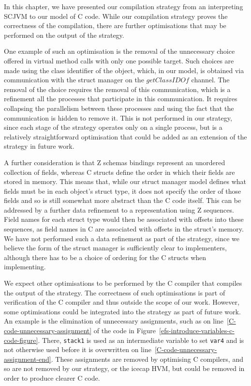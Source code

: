 In this chapter, we have presented our compilation strategy from an
interpreting SCJVM to our model of C code. While our compilation
strategy proves the correctness of the compilation, there are further
optimisations that may be performed on the output of the strategy.

One example of such an optimisation is the removal of the unnecessary
choice offered in virtual method calls with only one possible target.
Such choices are made using the class identifier of the object, which,
in our model, is obtained via communication with the struct manager on
the $getClassIDOf$ channel. 
The removal of the choice requires the removal of this communication,
which is a refinement all the processes that participate in this
communication. 
It requires collapsing the parallelism between these processes and
using the fact that the communication is hidden to remove it. 
This is not performed in our strategy, since each stage of the
strategy operates only on a single process, but is a relatively
straightforward optimisation that could be added as an extension of
the strategy in future work.

A further consideration is that Z schemas bindings represent an
unordered collection of fields, whereas C structs define the order in
which their fields are stored in memory.
This means that, while our struct manager model defines what fields
must be in each object's struct type, it does not specify the order of
those fields and so is still somewhat more abstract than the C code
itself.
This can be addressed by a further data refinement to a representation
using Z sequences.
Field names for each struct type would then be associated with offsets
into these sequences, as field names in C are associated with offsets
in the struct's memory.
We have not performed such a data refinement as part of the strategy,
since we believe the form of the struct manager is sufficiently clear
to implementers, although there has to be a choice of ordering for the
C structs when implementing.

We expect other optimisations to be performed by the C compiler that
compiles the output of the strategy.
The correctness of such optimisations is part of verification of the C
compiler and thus outside the scope of our work.
However, some optimisations could be integrated into the strategy as
part of future work.
An example is the elimination of unnecessary assignments, such as on
line~\ref{C-code-unnecessary-assignment} of the code in
Figure~\ref{efs-introduce-variables-c-code-figure}.
There, \texttt{stack1} is used as an intermediate variable to set
\texttt{var4} and is not otherwise used before it is overwritten on
line~\ref{C-code-unnecessary-assignment-end}.
These assignments are removed by optimising C compilers, and so are
not removed by our strategy, or the icecap HVM, but could be removed
in order to produce clearer C code.

